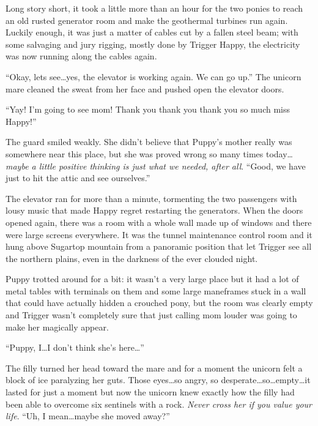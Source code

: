 \horizonline


Long story short, it took a little more than an hour for the two ponies to reach an old rusted generator room and make the geothermal turbines run again. Luckily enough, it was just a matter of cables cut by a fallen steel beam; with some salvaging and jury rigging, mostly done by Trigger Happy, the electricity was now running along the cables again.

``Okay, lets see\dots yes, the elevator is working again. We can go up.'' The unicorn mare cleaned the sweat from her face and pushed open the elevator doors.

``Yay! I'm going to see mom! Thank you thank you thank you so much miss Happy!''

The guard smiled weakly. She didn't believe that Puppy's mother really was somewhere near this place, but she was proved wrong so many times today\dots \emph{maybe a little positive thinking is just what we needed, after all}. ``Good, we have just to hit the attic and see ourselves.''

The elevator ran for more than a minute, tormenting the two passengers with lousy music that made Happy regret restarting the generators. When the doors opened again, there was a room with a whole wall made up of windows and there were large screens everywhere. It was the tunnel maintenance control room and it hung above Sugartop mountain from a panoramic position that let Trigger see all the northern plains, even in the darkness of the ever clouded night.

Puppy trotted around for a bit: it wasn't a very large place but it had a lot of metal tables with terminals on them and some large maneframes stuck in a wall that could have actually hidden a crouched pony, but the room was clearly empty and Trigger wasn't completely sure that just calling mom louder was going to make her magically appear.

``Puppy, I\dots I don't think she's here\dots''

The filly turned her head toward the mare and for a moment the unicorn felt a block of ice paralyzing her guts. Those eyes\dots so angry, so desperate\dots so\dots empty\dots it lasted for just a moment but now the unicorn knew exactly how the filly had been able to overcome six sentinels with a rock. \emph{Never cross her if you value your life}. ``Uh, I mean\dots maybe she moved away?''

